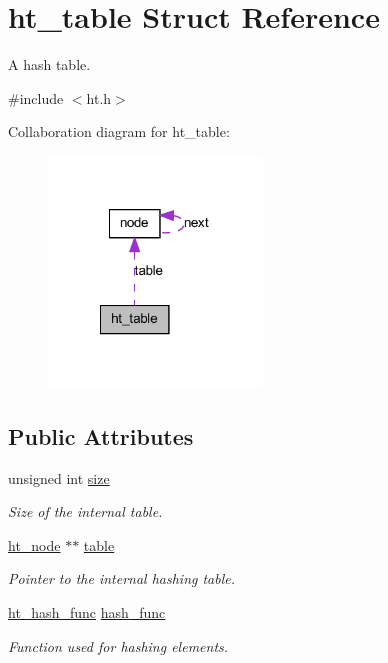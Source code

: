 \hypertarget{structht__table}{
\section{ht\_\-table Struct Reference}
\label{structht__table}
}


A hash table.  




{\ttfamily \#include $<$ht.h$>$}



Collaboration diagram for ht\_\-table:
\nopagebreak
\begin{figure}[H]
\begin{center}
\leavevmode
\includegraphics[width=161pt]{structht__table__coll__graph}
\end{center}
\end{figure}
\subsection*{Public Attributes}
\begin{DoxyCompactItemize}
\item 
unsigned int \hyperlink{structht__table_a493b0baf20b4274a08b5451e61f8e5f4}{size}
\begin{DoxyCompactList}\small\item\em Size of the internal table. \item\end{DoxyCompactList}\item 
\hyperlink{structnode}{ht\_\-node} $\ast$$\ast$ \hyperlink{structht__table_ae739f6f0d8b6cd6f55337ae7d0761dfc}{table}
\begin{DoxyCompactList}\small\item\em Pointer to the internal hashing table. \item\end{DoxyCompactList}\item 
\hyperlink{ht_8h_a91a8d03489ef281e6f26d389c44d42cf}{ht\_\-hash\_\-func} \hyperlink{structht__table_abe53fe8d261dea812255944769d22f45}{hash\_\-func}
\begin{DoxyCompactList}\small\item\em Function used for hashing elements. \item\end{DoxyCompactList}\end{DoxyCompactItemize}


